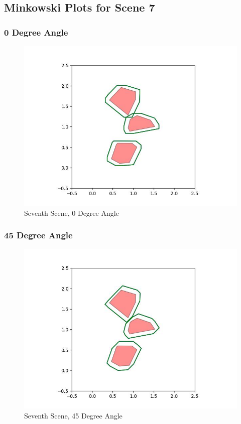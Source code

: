 \documentclass{article}
\begin{document}
\newpage
\subsection{Minkowski Plots for Scene 7}
\subsubsection{0 Degree Angle}
\begin{figure}[h!]
	\includegraphics[width= 0.9 \linewidth]{Problem3_minkowski7_0.jpg}
	\centering
	\caption{Seventh Scene, 0 Degree Angle}
	\label{Problem3_minkowski7_0.jpg}
\end{figure}

\newpage
\subsubsection{45 Degree Angle}
\begin{figure}[h!]
	\includegraphics[width= 0.9 \linewidth]{Problem3_minkowski7_45.jpg}
	\centering
	\caption{Seventh Scene, 45 Degree Angle}
	\label{Problem3_minkowski7_45.jpg}
\end{figure}
\end{document}
